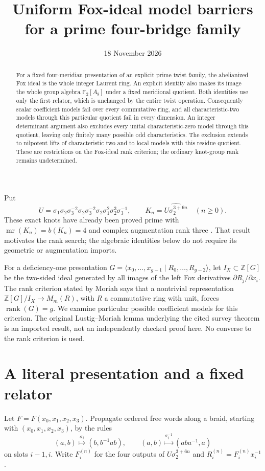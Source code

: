 \documentclass[11pt]{article}
\title{Uniform Fox-ideal model barriers\protect\\for a prime four-bridge family}
\author{}
\date{18 November 2026}
\newcommand{\Z}{\mathbb Z}
\newcommand{\F}{\mathbb F}
\begin{document}
\maketitle
\begin{abstract}
For a fixed four-meridian presentation of an explicit prime twist
family, the abelianized Fox ideal is the whole integer Laurent ring.
An explicit identity also makes its image the whole group algebra
$\F_2[A_8]$ under a fixed meridional quotient. Both identities use only
the first relator, which is unchanged by the entire twist operation.
Consequently scalar coefficient models fail over every commutative
ring, and all characteristic-two models through this particular
quotient fail in every dimension. An integer determinant argument
also excludes every unital characteristic-zero model through this quotient,
leaving only finitely many possible odd characteristics. The exclusion
extends to nilpotent lifts of characteristic two and to local models
with this residue quotient. These are restrictions on the Fox-ideal rank
criterion; the ordinary knot-group rank remains undetermined.
\end{abstract}

Put
\begin{equation}\label{eq:family}
 U=\sigma_1\sigma_2\sigma_3^{-2}\sigma_2\sigma_3^{-2}
 \sigma_2\sigma_1^2\sigma_2^3\sigma_3^{-1},\qquad
 K_n=\widehat{U\sigma_2^{3+6n}}\quad(n\ge0).
\end{equation}
These exact knots have already been proved prime with
$\operatorname{mr}(K_n)=b(K_n)=4$ and complex augmentation rank three
\cite{family}. That result motivates the rank search; the algebraic
identities below do not require its geometric or augmentation imports.

For a deficiency-one presentation
$G=\langle x_0,\ldots,x_{g-1}\mid R_0,\ldots,R_{g-2}\rangle$,
let $I_X\subset\Z[G]$ be the two-sided ideal generated by all images
of the left Fox derivatives $\partial R_j/\partial x_i$.
The rank criterion stated by Moriah \cite[pp.~197--198, Theorem~3.5]{moriah}
says that a nontrivial representation
$\Z[G]/I_X\longrightarrow M_m(R)$, with $R$ a commutative ring with
unit, forces $\operatorname{rank}(G)=g$.
We examine particular possible coefficient models for this criterion.
The original Lustig--Moriah lemma underlying the cited survey theorem
is an imported result, not an independently checked proof here.
No converse to the rank criterion is used.

\section{A literal presentation and a fixed relator}
Let $F=F(x_0,x_1,x_2,x_3)$. Propagate ordered free words along a
braid, starting with $(x_0,x_1,x_2,x_3)$, by the rules
\begin{equation}\label{eq:action}
 (a,b)\stackrel{\sigma_i}{\longmapsto}(b,b^{-1}ab),\qquad
 (a,b)\stackrel{\sigma_i^{-1}}{\longmapsto}(aba^{-1},a)
\end{equation}
on slots $i-1,i$. Write $F_i^{(n)}$ for the four outputs of
$U\sigma_2^{3+6n}$ and $R_i^{(n)}=F_i^{(n)}x_i^{-1}$.
\end{document}
